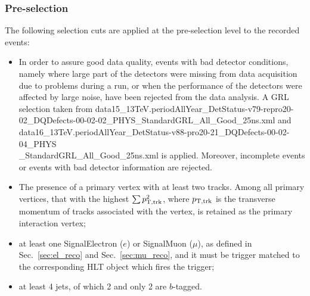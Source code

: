 \subsubsection{Pre-selection}
The following selection cuts are applied at the pre-selection level to the recorded events:
\begin{itemize}
\item In order to assure good data quality, events with bad detector
  conditions, namely where large part of the detectors were missing
  from data acquisition due to problems during a run, or when the
  performance of the detectors were affected by large noise, have been
  rejected from the data analysis. A GRL selection taken from
  data15\_13TeV.periodAllYear\_DetStatus-v79-repro20-02\_DQDefects-00-02-02\_PHYS\_StandardGRL\_All\_Good\_25ns.xml
  and data16\_13TeV.periodAllYear\_DetStatus-v88-pro20-21\_DQDefects-00-02-04\_PHYS \\ \_StandardGRL\_All\_Good\_25ns.xml
  is applied. Moreover, incomplete events or events with bad detector information are rejected. 

\item The presence of a  primary vertex with at least two
  tracks. Among all primary vertices, that with the highest
	$\sum p_{{\rm T,trk}}^{2}$, where
	$p_{{\rm T,trk}}$ is the transverse momentum of tracks
	associated with the vertex, is retained as the primary
  interaction vertex;
\item at least one SignalElectron ($e$) or SignalMuon ($\mu$), as defined in Sec.~\ref{sec:el_reco} and Sec.~\ref{sec:mu_reco}, and it must be trigger matched to the 
corresponding HLT object which fires the trigger;
\item at least 4 jets, of which 2 and only 2 are $b$-tagged.
\end{itemize}

